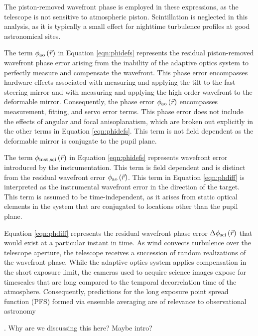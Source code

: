 The piston-removed wavefront phase is
employed in these expressions, as the telescope is not sensitive to
atmospheric piston.  Scintillation is neglected in this analysis, as
it is typically a small effect for nighttime turbulence profiles at good
astronomical sites.

The term $\phi_{\rm ao}\left(\vec{r}\right)$ in Equation
\ref{eqn:phidefs} represents the residual piston-removed wavefront phase
error arising from the inability of the adaptive optics system to
perfectly measure and compensate the wavefront.  This phase error
encompasses hardware effects associated with measuring and applying
the tilt to the fast steering mirror and with measuring and applying
the high order wavefront to the deformable mirror.  Consequently, the
phase error $\phi_{\rm ao}\left(\vec{r}\right)$ encompasses
measurement, fitting, and servo error terms.  This phase error does
not include the effects of angular and focal anisoplanatism, which
are broken out explicitly in the other terms in Equation
\ref{eqn:phidefs}. This term is not field dependent as the deformable
mirror is conjugate to the pupil plane. 

The term $\phi_{\rm inst,sci}\left(\vec{r}\right)$ in Equation
\ref{eqn:phidefs} represents wavefront error introduced by the
instrumentation.  This term is field dependent and is distinct from
the residual wavefront error $\phi_{\rm ao}\left(\vec{r}\right)$.
This term in Equation \ref{eqn:phdiff} is interpreted as the
instrumental wavefront error in the direction of the target.  This
term is assumed to be time-independent, as it arises from static
optical elements in the system that are conjugated to locations other
than the pupil plane.  

Equation \ref{eqn:phdiff} represents the residual wavefront phase error
$\Delta\phi_{\rm sci}\left(\vec{r}\right)$ that would exist at
a particular instant in time.  As wind convects turbulence over the
telescope aperture, the telescope receives a succession of random
realizations of the wavefront phase.  While the adaptive optics system
applies compensation in the short exposure limit, the cameras used to
acquire science images expose for timescales that are long compared to
the temporal decorrelation time of the atmosphere.  
Consequently, predictions for the
long exposure point spread function (PFS) formed via ensemble averaging are
of relevance to observational astronomy
\begin{notes}
[CITE]. Why are we discussing this here? Maybe intro?
\end{notes}


